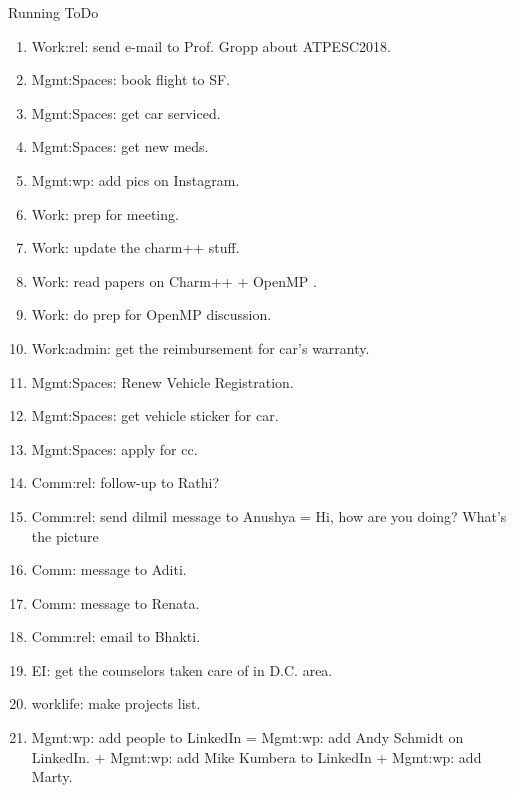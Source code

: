 \begin{columns}
\begin{column}{0.6\linewidth}
\begin{block}{Running ToDo}
\begin{enumerate}
      \item \tiny Work:rel: send e-mail to Prof. Gropp about ATPESC2018.  

      \item \tiny Mgmt:Spaces: book flight to SF. 

      \item \tiny Mgmt:Spaces: get car serviced. 
      \item \tiny Mgmt:Spaces: get new meds. 
      \item \tiny Mgmt:wp: add pics on Instagram. 

      \item \tiny Work: prep for meeting.

      \item \tiny Work: update the charm++ stuff. 
      \item \tiny Work: read papers on Charm++ + OpenMP . 
      \item \tiny Work: do prep for OpenMP discussion.

      \item \tiny Work:admin: get the reimbursement for car’s warranty.  
          
      \item \tiny Mgmt:Spaces: Renew Vehicle Registration. 
      \item \tiny Mgmt:Spaces: get vehicle sticker for car. 
      \item \tiny Mgmt:Spaces: apply for cc. 

      \item \tiny Comm:rel: follow-up to Rathi? 
      \item \tiny Comm:rel: send dilmil message to Anushya = Hi, how
        are you doing? What's the picture 
      \item \tiny Comm: message to Aditi. 

      \item \tiny Comm: message to Renata.
      \item \tiny Comm:rel: email to Bhakti. 

      \item \tiny EI: get the counselors taken care of in D.C. area. 
       
      \item \tiny worklife: make projects list. 
      \item \tiny Mgmt:wp: add people to LinkedIn =  Mgmt:wp: add Andy
        Schmidt on LinkedIn. +  Mgmt:wp: add Mike Kumbera to LinkedIn +
        Mgmt:wp: add Marty. 


\end{enumerate}
\end{block}
\end{column}
\end{columns}
